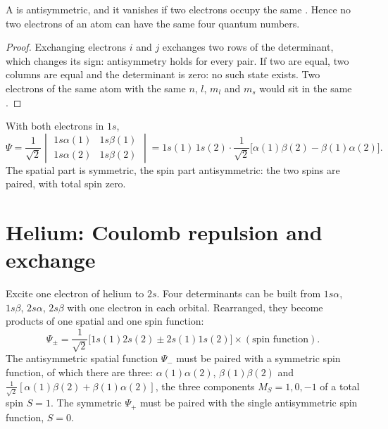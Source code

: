 \begin{theorem}\label{thm:b3:many-electron-atoms:pauli}
A  is antisymmetric, and it vanishes if two electrons
occupy the same . Hence no two electrons of an atom can have the
same four quantum numbers.
\end{theorem}

\begin{proof}
Exchanging electrons $i$ and $j$ exchanges two rows of the determinant,
which changes its sign: antisymmetry holds for every pair. If two
 are equal, two columns are equal and the determinant is zero:
no such state exists. Two electrons of the same atom with the same $n$, $l$,
$m_l$ and $m_s$ would sit in the same .
\end{proof}

\begin{example}\label{ex:b3:many-electron-atoms:helium-ground}
With both electrons in $1s$,
\[
\Psi = \frac{1}{\sqrt2}\begin{vmatrix}1s\alpha(1) & 1s\beta(1)\\ 1s\alpha(2) &
1s\beta(2)\end{vmatrix} = 1s(1)\,1s(2)\cdot\frac{1}{\sqrt2}\big[\alpha(1)\beta(2)
- \beta(1)\alpha(2)\big].
\]
The spatial part is symmetric, the spin part antisymmetric: the two spins
are paired, with total spin zero.
\end{example}

\section{Helium: Coulomb repulsion and exchange}

Excite one electron of helium to $2s$. Four determinants can be built from
$1s\alpha$, $1s\beta$, $2s\alpha$, $2s\beta$ with one electron in each orbital.
Rearranged, they become products of one spatial and one spin function:
\[
\Psi_\pm = \frac{1}{\sqrt2}\big[1s(1)2s(2) \pm 2s(1)1s(2)\big]\times(\text{spin
function}).
\]
The antisymmetric spatial function $\Psi_-$ must be paired with a symmetric
spin function, of which there are three: $\alpha(1)\alpha(2)$,
$\beta(1)\beta(2)$ and $\frac{1}{\sqrt2}[\alpha(1)\beta(2) + \beta(1)\alpha(2)]$, the
three components $M_S = 1, 0, -1$ of a total spin $S = 1$. The symmetric
$\Psi_+$ must be paired with the single antisymmetric spin function, $S = 0$.

